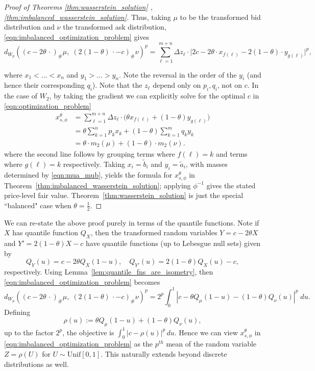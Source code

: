 \begin{subappendices}
\begin{proof}[Proof of Theorems \ref{thm:wasserstein_solution} ,\ref{thm:imbalanced_wasserstein_solution}]
\noindent Thus, taking $\mu$ to be the transformed bid distribution and $\nu$ the transformed ask distribution, \eqref{eqn:imbalanced_optimization_problem} gives
%
\begin{equation}
    d_{W_p}\left((c-2\theta\,\cdot)_\#\mu, \; (2(1-\theta)\,\cdot-c)_\#\nu \right)^p = \sum_{\ell = 1}^{m+n} \Delta z_\ell \cdot \Big|2c-2\theta \cdot x_{f(\ell)} - 2(1-\theta) \cdot y_{g(\ell)}\Big|^p,
\end{equation}
%

\noindent where $x_1 < ... < x_n$ and $y_1 > ... > y_n$. Note the reversal in the order of the $y_i$ (and hence their corresponding $q_i$). Note that the $z_\ell$ depend only on $p_i, q_i$, not on $c$. In the case of $W_2$, by taking the gradient we can explicitly solve for the optimal $c$ in \eqref{eqn:optimization_problem}
%
\begin{align*}
    x_{s,\phi}^\theta & = \sum_{\ell = 1}^{m+n} \Delta z_\ell \cdot \Big( \theta x_{f(\ell)} + (1-\theta)y_{g(\ell)} \Big) \\
    & =  \theta \sum_{k=1}^n p_k x_k +  (1-\theta)\sum_{k=1}^m q_ky_k \\
    & = \theta \cdot m_2(\mu) + (1-\theta) \cdot m_2(\nu).
\end{align*}
%
\noindent where the second line follows by grouping terms where $f(\ell) = k$ and
terms where $g(\ell) = k$ respectively. Taking $x_i=\widetilde b_i$ and $y_i=\widetilde a_i$, with masses determined by \eqref{eqn:mua_mub}, yields the formula for $x_{s,\phi}^\theta$ in Theorem~\ref{thm:imbalanced_wasserstein_solution}; applying $\phi^{-1}$ gives the stated price-level fair value.
Theorem~\ref{thm:wasserstein_solution} is just the special ``balanced" case when $\theta = \frac{1}{2}$.
\end{proof}

We can re-state the above proof purely in terms of the quantile functions. Note if $X$ has
quantile function $Q_X$, then the transformed random variables $Y = c-2\theta X$ and $Y' = 2(1-\theta)X - c$ have
quantile functions (up to Lebesgue null sets) given by
%
    \[Q_Y(u) = c-2\theta Q_X(1-u), \quad Q_{Y'}(u) = 2(1-\theta) Q_X(u) - c,\]
%
\noindent respectively. Using Lemma~\ref{lem:quantile_fns_are_isometry}, then \eqref{eqn:imbalanced_optimization_problem} becomes
%
\[d_{W_p}\left((c-2\theta\,\cdot)_\#\mu, \; (2(1-\theta)\,\cdot-c)_\#\nu\right)^p = 2^p \int_0^1 \left|c - \theta Q_\mu(1-u) - (1-\theta) Q_\nu(u)\right|^p \; du.\]
%
\noindent Defining
%
\[\rho(u) := \theta Q_\mu(1-u) + (1-\theta) Q_\nu(u),\]
%
\noindent up to the factor $2^p$, the objective is $\int_0^1 |c-\rho(u)|^p\,du$. Hence we can
view $x_{s,\phi}^\theta$ in \eqref{eqn:imbalanced_optimization_problem} as the $p^{th}$ mean of the
random variable $Z = \rho(U)$ for $U \sim \mathrm{Unif}[0,1]$. This naturally extends
beyond discrete distributions as well.


\end{subappendices}
